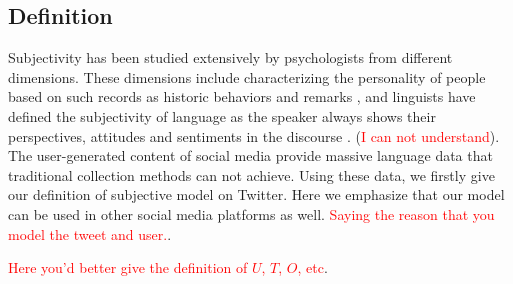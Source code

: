 \documentclass{acm_proc_article-sp}
\newcommand{\mo}[1]{\textcolor{red}{#1}}
\begin{document}
\subsection{Definition}
\label{definition}

Subjectivity has been studied extensively by psychologists from different dimensions. These  dimensions include characterizing the personality of people based on such records as historic behaviors and remarks \cite{Engbert2007}, and linguists have defined the subjectivity of language as the speaker always shows their perspectives, attitudes and sentiments in the discourse \cite{stein2005subjectivity}.  (\mo{I can not understand}). 
The user-generated content of social media provide massive language data that traditional collection methods can not achieve.
Using these data, we firstly give our definition of subjective model on Twitter. Here we emphasize that our model can be used in other social media platforms as well. \mo{Saying the reason that you model the tweet and user.}. 

\mo{Here you'd better give the definition of $U$, $T$, $O$, etc}. 
\end{document}
